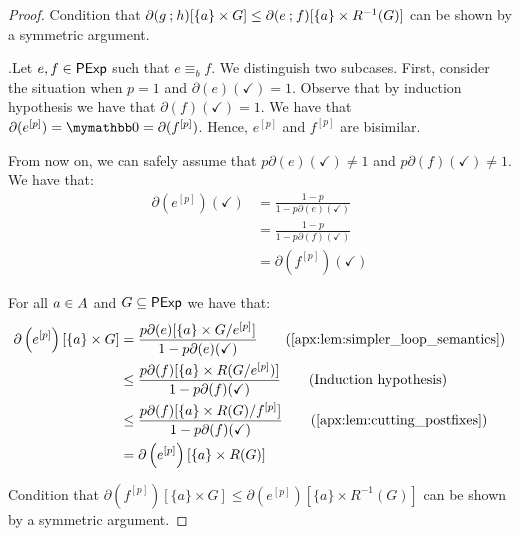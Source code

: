 \begin{proof}
    Condition that $\partial(g \mathbin{;} h)[\{a\} \times G] \leq \partial(e \mathbin{;} f)[\{a\} \times R^{-1}(G)]$ can be shown by a symmetric argument.

    \item[] .Let $e,f \in \mathsf{PExp}$ such that $e\equiv_b f$. We distinguish two subcases. First, consider the situation when $p=1$ and $\partial(e)(\checkmark)=1$. Observe that by induction hypothesis we have that $\partial(f)(\checkmark)=1$.
   	We have that $\partial(e^{[p]}) = \emptydist = \partial(f^{[p]})$. Hence, $e^{[p]}$ and $f^{[p]}$ are bisimilar.

    From now on, we can safely assume that $p\partial(e)(\checkmark)\neq 1$ and $p\partial(f)(\checkmark)\neq 1$. We have that:
    \begin{align*}
        \partial \left( e^{[p]} \right) (\checkmark) &= \frac{1-p}{1-p\partial(e)(\checkmark)} \\
        &= \frac{1-p}{1-p\partial(f)(\checkmark)} \tag{Induction hypothesis}\\
        &= \partial \left( f^{[p]} \right) (\checkmark)
    \end{align*}

    For all $a \in {A}$ and $G \subseteq \mathsf{PExp}$ we have that:
    \begin{align*}
        \partial \left( e^{[p]} \right)[\{a\} \times G] &= \frac{p\partial(e)[\{a\}\times {{G}/{e^{[p]}}}]}{1-p\partial(e)(\checkmark)} \tag{\Cref{apx:lem:simpler_loop_semantics}} \\
        &\leq \frac{p\partial(f)[\{a\}\times R({{G}/{e^{[p]}}})]}{1-p\partial(f)(\checkmark)} \tag{Induction hypothesis}\\
        &\leq \frac{p\partial(f)[\{a\}\times {{R(G)}/{f^{[p]}}}]}{1-p\partial(f)(\checkmark)} \tag{\Cref{apx:lem:cutting_postfixes}} \\
        &= \partial \left( e^{[p]} \right)[\{a\} \times R(G)]
    \end{align*}

    Condition that $\partial\left(f^{[p]}\right)[\{a\} \times G] \leq \partial\left(e^{[p]}\right)[\{a\} \times R^{-1}(G)]$ can be shown by a symmetric argument.
\end{proof}


